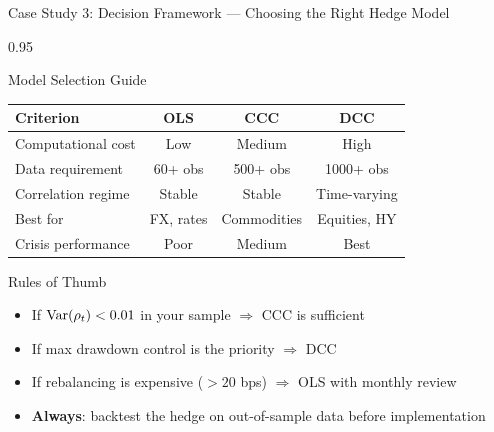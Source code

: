 \documentclass[9pt, aspectratio=169, t]{beamer}
\begin{document}
\begin{frame}{Case Study 3: Decision Framework --- Choosing the Right Hedge Model}
    \begin{cminipage}{0.95\textwidth}
    {\footnotesize
    \begin{block}{Model Selection Guide}
        \vspace{0.1cm}
        {\small
        \begin{center}
        \begin{tabular}{l|c|c|c}
            \hline
            \textbf{Criterion} & \textbf{OLS} & \textbf{CCC} & \textbf{DCC} \\
            \hline
            Computational cost & Low & Medium & High \\
            Data requirement   & 60+ obs & 500+ obs & 1000+ obs \\
            Correlation regime & Stable & Stable & Time-varying \\
            Best for           & FX, rates & Commodities & Equities, HY \\
            Crisis performance & Poor & Medium & Best \\
            \hline
        \end{tabular}
        \end{center}
        }
    \end{block}
    \begin{alertblock}{Rules of Thumb}
        \begin{itemize}\setlength{\itemsep}{0pt}
            \item If $\text{Var}(\rho_t) < 0.01$ in your sample $\Rightarrow$ CCC is sufficient
            \item If max drawdown control is the priority $\Rightarrow$ DCC
            \item If rebalancing is expensive ($> 20$ bps) $\Rightarrow$ OLS with monthly review
            \item \textbf{Always}: backtest the hedge on out-of-sample data before implementation
        \end{itemize}
    \end{alertblock}
    }
    \end{cminipage}
\end{frame}
\end{document}

